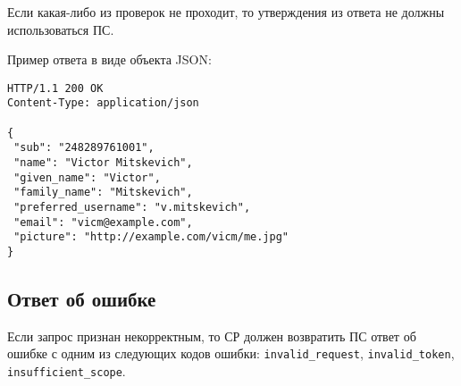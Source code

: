 Если какая-либо из проверок не проходит, то утверждения из ответа 
не должны использоваться ПС. 
 
Пример ответа в виде объекта JSON:
%
\begin{lstlisting}
HTTP/1.1 200 OK
Content-Type: application/json

{
 "sub": "248289761001",
 "name": "Victor Mitskevich",
 "given_name": "Victor",
 "family_name": "Mitskevich",
 "preferred_username": "v.mitskevich",
 "email": "vicm@example.com",
 "picture": "http://example.com/vicm/me.jpg"
}
\end{lstlisting}

\subsection{Ответ об ошибке}\label{REQRESP.UserInfo.Error}

Если запрос признан некорректным, то СР должен возвратить ПС 
ответ об ошибке с одним из следующих кодов ошибки: 
\lstinline{invalid_request},
\lstinline{invalid_token}, 
\lstinline{insufficient_scope}. 

